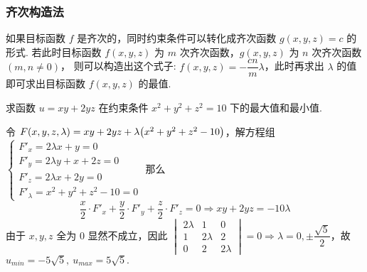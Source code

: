 \subsubsection{齐次构造法}

如果目标函数 $f$ 是齐次的，同时约束条件可以转化成齐次函数 $g(x,y,z)=c$ 的形式.
若此时目标函数 $f(x,y,z)$ 为 $m$ 次齐次函数，$g(x,y,z)$ 为 $n$ 次齐次函数 $(m,n\neq0)$，
则可以构造出这个式子: $f(x,y,z)=-\dfrac{cn}{m}\lambda$，此时再求出 $\lambda$ 的值即可求出目标函数 $f(x,y,z)$ 的最值.

\begin{example}[2010 数三]
    求函数 $u=xy+2yz$ 在约束条件 $x^2+y^2+z^2=10$ 下的最大值和最小值.
\end{example}
\begin{solution}
    令 $F(x,y,z,\lambda)=xy+2yz+\lambda\qty(x^2+y^2+z^2-10)$，解方程组 
    $\begin{cases}
        F'_x=2 \lambda x + y=0\\ 
        F'_y=2 \lambda y + x + 2 z=0\\ 
        F'_z=2 \lambda x + 2y=0\\ 
        F'_\lambda=x^{2} + y^{2} + z^{2} - 10=0
    \end{cases}$ 那么 $$\dfrac{x}{2}\cdot F'_x+\dfrac{y}{2}\cdot F'_y+\dfrac{z}{2}\cdot F'_z=0\Rightarrow xy+2yz=-10\lambda$$
    由于 $x,y,z$ 全为 $0$ 显然不成立，因此 $\begin{vmatrix}
        2\lambda&1&0 \\ 1&2\lambda&2 \\ 0&2&2\lambda
    \end{vmatrix}=0\Rightarrow \lambda=0,\pm\dfrac{\sqrt{5}}{2}$，故 $u_{min}=-5\sqrt{5},~u_{max}=5\sqrt{5}.$
\end{solution}


